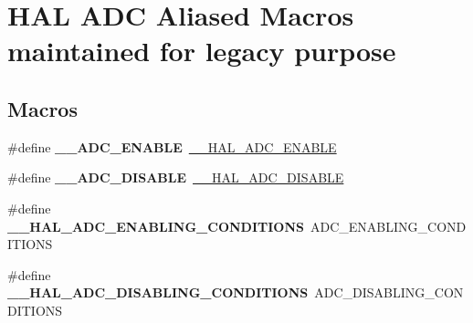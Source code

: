 \hypertarget{group___h_a_l___a_d_c___aliased___macros}{}\section{H\+AL A\+DC Aliased Macros maintained for legacy purpose}
\label{group___h_a_l___a_d_c___aliased___macros}
\subsection*{Macros}
\begin{DoxyCompactItemize}
\item 
\mbox{\label{group___h_a_l___a_d_c___aliased___macros_gade2e452da8695130dbc0b8b516ec16ff}} 
\#define {\bfseries \+\_\+\+\_\+\+A\+D\+C\+\_\+\+E\+N\+A\+B\+LE}~\hyperlink{group___a_d_c___exported___macros_gaadf16862da7593def189559423c287f4}{\+\_\+\+\_\+\+H\+A\+L\+\_\+\+A\+D\+C\+\_\+\+E\+N\+A\+B\+LE}
\item 
\mbox{\label{group___h_a_l___a_d_c___aliased___macros_ga6a8dfa9e047c1ac8f70d2fe3ae3fd4dc}} 
\#define {\bfseries \+\_\+\+\_\+\+A\+D\+C\+\_\+\+D\+I\+S\+A\+B\+LE}~\hyperlink{group___a_d_c___exported___macros_ga8afd5963c41c0a30c5cf1fec5c5710b3}{\+\_\+\+\_\+\+H\+A\+L\+\_\+\+A\+D\+C\+\_\+\+D\+I\+S\+A\+B\+LE}
\item 
\mbox{\label{group___h_a_l___a_d_c___aliased___macros_gaf09405aa65148ec822984b2d81992596}} 
\#define {\bfseries \+\_\+\+\_\+\+H\+A\+L\+\_\+\+A\+D\+C\+\_\+\+E\+N\+A\+B\+L\+I\+N\+G\+\_\+\+C\+O\+N\+D\+I\+T\+I\+O\+NS}~A\+D\+C\+\_\+\+E\+N\+A\+B\+L\+I\+N\+G\+\_\+\+C\+O\+N\+D\+I\+T\+I\+O\+NS
\item 
\mbox{\label{group___h_a_l___a_d_c___aliased___macros_ga758e02a9d4e37528e42ff60eff476cbf}} 
\#define {\bfseries \+\_\+\+\_\+\+H\+A\+L\+\_\+\+A\+D\+C\+\_\+\+D\+I\+S\+A\+B\+L\+I\+N\+G\+\_\+\+C\+O\+N\+D\+I\+T\+I\+O\+NS}~A\+D\+C\+\_\+\+D\+I\+S\+A\+B\+L\+I\+N\+G\+\_\+\+C\+O\+N\+D\+I\+T\+I\+O\+NS
\item 
\mbox{\label{group___h_a_l___a_d_c___aliased___macros_ga2c78554d5c9d8311297ea8fb01866309}} 

\end{DoxyCompactItemize}
